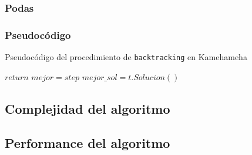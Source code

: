 \subsubsection{Podas}

\subsubsection{Pseudocódigo}
  \begin{algorithm}[H]
  \begin{algorithmic}
  \caption{Pseudocódigo del procedimiento de \texttt{backtracking} en Kamehameha}
      \State $return$
    \EndIf
      \State $mejor = step$
      \State $mejor\_sol = t.Solucion()$
    \Else
    \EndIf
    \EndProcedure
  \end{algorithmic}
  \end{algorithm}

\subsection{Complejidad del algoritmo}

\subsection{Performance del algoritmo}